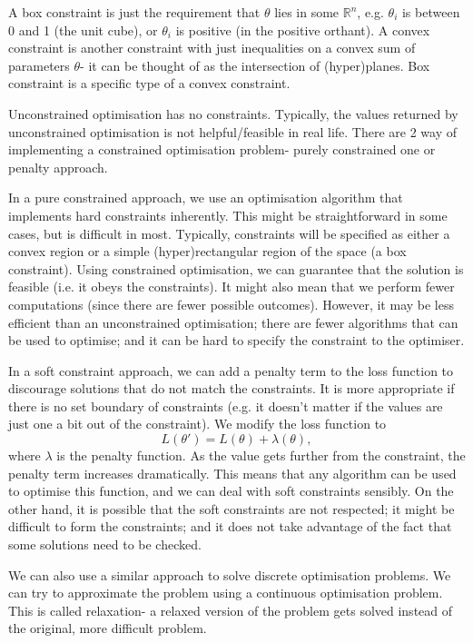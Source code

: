 \documentclass[a4paper, openany]{memoir}
\begin{document}
A box constraint is just the requirement that $\theta$ lies in some $\mathbb{R}^n$, e.g. $\theta_i$ is between 0 and 1 (the unit cube), or $\theta_i$ is positive (in the positive orthant). A convex constraint is another constraint with just inequalities on a convex sum of parameters $\theta$- it can be thought of as the intersection of (hyper)planes. Box constraint is a specific type of a convex constraint.

Unconstrained optimisation has no constraints. Typically, the values returned by unconstrained optimisation is not helpful/feasible in real life. There are 2 way of implementing a constrained optimisation problem- purely constrained one or penalty approach. 

In a pure constrained approach, we use an optimisation algorithm that implements hard constraints inherently. This might be straightforward in some cases, but is difficult in most. Typically, constraints will be specified as either a convex region or a simple (hyper)rectangular region of the space (a box constraint). Using constrained optimisation, we can guarantee that the solution is feasible (i.e. it obeys the constraints). It might also mean that we perform fewer computations (since there are fewer possible outcomes). However, it may be less efficient than an unconstrained optimisation; there are fewer algorithms that can be used to optimise; and it can be hard to specify the constraint to the optimiser.

In a soft constraint approach, we can add a penalty term to the loss function to discourage solutions that do not match the constraints. It is more appropriate if there is no set boundary of constraints (e.g. it doesn't matter if the values are just one a bit out of the constraint). We modify the loss function to
\[L(\theta') = L(\theta) + \lambda(\theta),\]
where $\lambda$ is the penalty function. As the value gets further from the constraint, the penalty term increases dramatically. This means that any algorithm can be used to optimise this function, and we can deal with soft constraints sensibly. On the other hand, it is possible that the soft constraints are not respected; it might be difficult to form the constraints; and it does not take advantage of the fact that some solutions need to be checked.

We can also use a similar approach to solve discrete optimisation problems. We can try to approximate the problem using a continuous optimisation problem. This is called relaxation- a relaxed version of the problem gets solved instead of the original, more difficult problem.
\end{document}
